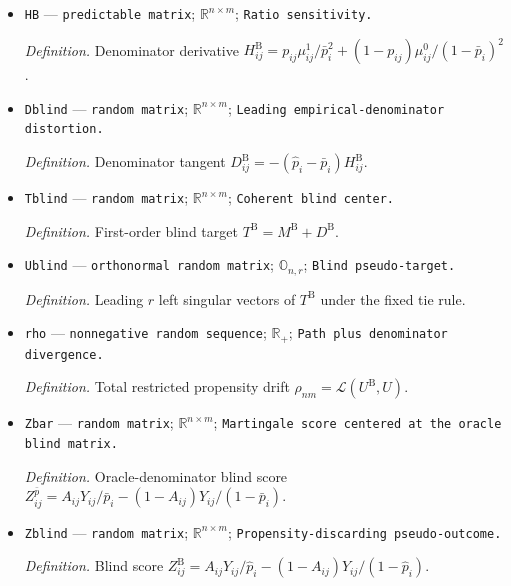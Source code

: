 \documentclass{article}
\begin{document}
\begin{itemize}
  \par\smallskip\noindent\emph{Definition.} Leading \(r\) left singular vectors \(U^{\mathrm O}\) of the oracle blind center \(M^{\mathrm B}\) under the fixed tie rule.
  \item \texttt{HB} --- \texttt{predictable matrix}; \(\mathbb R^{n\times m}\); \texttt{Ratio sensitivity.}
  \par\smallskip\noindent\emph{Definition.} Denominator derivative \(H^{\mathrm B}_{ij}=p_{ij}\mu^1_{ij}/\bar p_i^2+(1-p_{ij})\mu^0_{ij}/(1-\bar p_i)^2\).
  \item \texttt{Dblind} --- \texttt{random matrix}; \(\mathbb R^{n\times m}\); \texttt{Leading empirical-\allowbreak{}denominator distortion.}
  \par\smallskip\noindent\emph{Definition.} Denominator tangent \(D^{\mathrm B}_{ij}=-(\widehat p_i-\bar p_i)H^{\mathrm B}_{ij}\).
  \item \texttt{Tblind} --- \texttt{random matrix}; \(\mathbb R^{n\times m}\); \texttt{Coherent blind center.}
  \par\smallskip\noindent\emph{Definition.} First-order blind target \(T^{\mathrm B}=M^{\mathrm B}+D^{\mathrm B}\).
  \item \texttt{Ublind} --- \texttt{orthonormal random matrix}; \(\mathbb O_{n,r}\); \texttt{Blind pseudo-\allowbreak{}target.}
  \par\smallskip\noindent\emph{Definition.} Leading \(r\) left singular vectors of \(T^{\mathrm B}\) under the fixed tie rule.
  \item \texttt{rho} --- \texttt{nonnegative random sequence}; \(\mathbb R_+\); \texttt{Path plus denominator divergence.}
  \par\smallskip\noindent\emph{Definition.} Total restricted propensity drift \(\rho_{nm}=\mathcal L(U^{\mathrm B},U)\).
  \item \texttt{Zbar} --- \texttt{random matrix}; \(\mathbb R^{n\times m}\); \texttt{Martingale score centered at the oracle blind matrix.}
  \par\smallskip\noindent\emph{Definition.} Oracle-denominator blind score \(Z^{\bar p}_{ij}=A_{ij}Y_{ij}/\bar p_i-(1-A_{ij})Y_{ij}/(1-\bar p_i)\).
  \item \texttt{Zblind} --- \texttt{random matrix}; \(\mathbb R^{n\times m}\); \texttt{Propensity-\allowbreak{}discarding pseudo-\allowbreak{}outcome.}
  \par\smallskip\noindent\emph{Definition.} Blind score \(Z^{\mathrm B}_{ij}=A_{ij}Y_{ij}/\widehat p_i-(1-A_{ij})Y_{ij}/(1-\widehat p_i)\).

\end{itemize}
\end{document}
